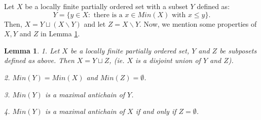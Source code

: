 \documentclass[12pt]{article}
\newtheorem{lemma}[theorem]{Lemma}
\begin{document}


\medskip

Let $X$ be a locally finite partially ordered set with a subset $Y$ defined as:
\begin{equation*}
Y =\{y \in X : \mbox{ there is a }x \in Min(X) \mbox{ with } x \leq y\}.
\end{equation*}
Then,  $X = Y \sqcup (X \backslash Y)$ and let $Z = X \backslash Y$. Now, we mention some properties of $%
X,Y $ and $Z$ in Lemma \ref{Veli}.

\begin{lemma}
\label{Veli} 1. Let $X$ be a locally finite partially ordered set, $Y$ and $%
Z $ be subposets defined as above. Then $X = Y \sqcup Z$, (ie. $X$ is a
disjoint union of $Y$ and $Z$).

2. $Min(Y)=Min(X)$ and $Min(Z) = \emptyset$.

3. $Min(Y)$ is a maximal antichain of $Y$.

4. $Min(Y)$ is a maximal antichain of $X$ if and only if $Z = \emptyset$.
\end{lemma}
\end{document}
